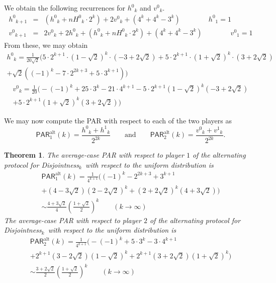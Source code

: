\documentclass{article}
\theoremstyle{theorem}
\newtheorem{theorem}{Theorem}[section]
\theoremstyle{definition}
\theoremstyle{remark}
\newcommand{\disjoint}{{\sc Dis\-joint\-ness}\ensuremath{_k}}
\newcommand{\vy}{\ensuremath{v^1}}
\newcommand{\vn}{\ensuremath{v^0}}
\newcommand{\hy}{\ensuremath{h^1}}
\newcommand{\hn}{\ensuremath{h^0}}
\newcommand{\nh}{\ensuremath{nH^0}}
\newcommand{\paratio}{\ensuremath{\mathsf{PAR}}}
\begin{document}
We obtain the following recurrences for $\hn_k$ and $\vn_k$.
\begin{eqnarray*}
\hn_{k+1} &=& \left(\hn_k + \nh_k\cdot 2^k\right)+2\vn_k + \left(4^k+4^k-3^k\right)\qquad\qquad \hn_1 = 1\\
\vn_{k+1} &=& 2\vn_k + 2\hn_k + \left(\hn_k + \nh_k\cdot 2^k \right)+\left(4^k + 4^k - 3^k\right) \qquad\qquad \vn_1 = 1
\end{eqnarray*}
From these, we may obtain
\begin{multline*}
\hn_k = \frac{1}{20\sqrt{2}}\bigg(5\cdot 2^{k+1}\cdot (1 - \sqrt{2})^k\cdot (-3 + 2\sqrt{2}) + 5\cdot 2^{k+1}\cdot (1 + \sqrt{2})^k\cdot (3 + 2\sqrt{2})\\ + \sqrt{2}((-1)^k - 7\cdot 2^{2k+3} + 5\cdot 3^{k+1})\bigg)
\end{multline*}
\begin{multline*}
\vn_k = \frac{1}{20}\bigg(-(-1)^k + 25\cdot 3^k - 21\cdot 4^{k+1} - 5\cdot 2^{k+1}(1 - \sqrt{2})^k(-3 + 2\sqrt{2})\\ + 5\cdot 2^{k+1}(1 + \sqrt{2})^k(3 + 2\sqrt{2})\bigg)
\end{multline*}

We may now compute the PAR with respect to each of the two players as
\[
\paratio^\mathrm{alt}_1(k) = \frac{\hn_k + \hy_k}{2^{2k}}\qquad\mathrm{and}\qquad\paratio^\mathrm{alt}_2(k) = \frac{\vn_k + \vy_k}{2^{2k}}.
\]


\begin{theorem}
The average-case PAR with respect to player $1$ of the alternating protocol for \disjoint\ with respect to the uniform distribution is
\begin{multline*}
\paratio^\mathrm{alt}_1(k) = \frac{1}{4^{k+1}}\bigg((-1)^k - 2^{2k+3} + 3^{k+1}\\ + (4-3\sqrt{2})(2-2\sqrt{2})^k + (2+2\sqrt{2})^k(4+3\sqrt{2})\bigg)\\
   \sim \frac{4+3\sqrt{2}}{4}\left(\frac{1+\sqrt{2}}{2}\right)^k \qquad (k\rightarrow\infty)
\end{multline*}
The average-case PAR with respect to player $2$ of the alternating protocol for \disjoint\ with respect to the uniform distribution is
\begin{multline*}
\paratio^\mathrm{alt}_2(k) = \frac{1}{4^{k+1}}\bigg(-(-1)^k + 5\cdot 3^k - 3\cdot 4^{k+1}\\ + 2^{k+1}(3-2\sqrt{2})(1-\sqrt{2})^k + 2^{k+1}(3+2\sqrt{2})(1+\sqrt{2})^k\bigg)\\
    \sim \frac{3+2\sqrt{2}}{2}\left(\frac{1+\sqrt{2}}{2}\right)^k \qquad (k\rightarrow \infty)
\end{multline*}
\end{theorem}
\end{document}
